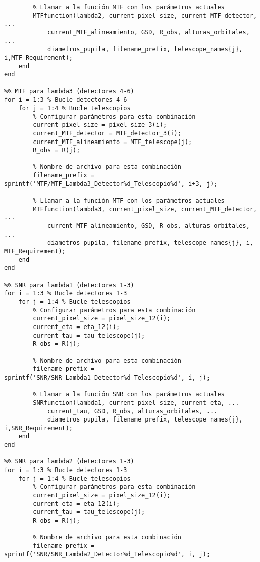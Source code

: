 \begin{verbatim}
        % Llamar a la función MTF con los parámetros actuales
        MTFfunction(lambda2, current_pixel_size, current_MTF_detector, ...
            current_MTF_alineamiento, GSD, R_obs, alturas_orbitales, ...
            diametros_pupila, filename_prefix, telescope_names{j}, i,MTF_Requirement);
    end
end

%% MTF para lambda3 (detectores 4-6)
for i = 1:3 % Bucle detectores 4-6
    for j = 1:4 % Bucle telescopios
        % Configurar parámetros para esta combinación
        current_pixel_size = pixel_size_3(i);
        current_MTF_detector = MTF_detector_3(i);
        current_MTF_alineamiento = MTF_telescope(j);
        R_obs = R(j);
        
        % Nombre de archivo para esta combinación
        filename_prefix = sprintf('MTF/MTF_Lambda3_Detector%d_Telescopio%d', i+3, j);
        
        % Llamar a la función MTF con los parámetros actuales
        MTFfunction(lambda3, current_pixel_size, current_MTF_detector, ...
            current_MTF_alineamiento, GSD, R_obs, alturas_orbitales, ...
            diametros_pupila, filename_prefix, telescope_names{j}, i, MTF_Requirement);
    end
end

%% SNR para lambda1 (detectores 1-3)
for i = 1:3 % Bucle detectores 1-3
    for j = 1:4 % Bucle telescopios
        % Configurar parámetros para esta combinación
        current_pixel_size = pixel_size_12(i);
        current_eta = eta_12(i);
        current_tau = tau_telescope(j);
        R_obs = R(j);
        
        % Nombre de archivo para esta combinación
        filename_prefix = sprintf('SNR/SNR_Lambda1_Detector%d_Telescopio%d', i, j);
        
        % Llamar a la función SNR con los parámetros actuales
        SNRfunction(lambda1, current_pixel_size, current_eta, ...
            current_tau, GSD, R_obs, alturas_orbitales, ...
            diametros_pupila, filename_prefix, telescope_names{j}, i,SNR_Requirement);
    end
end

%% SNR para lambda2 (detectores 1-3)
for i = 1:3 % Bucle detectores 1-3
    for j = 1:4 % Bucle telescopios
        % Configurar parámetros para esta combinación
        current_pixel_size = pixel_size_12(i);
        current_eta = eta_12(i);
        current_tau = tau_telescope(j);
        R_obs = R(j);
        
        % Nombre de archivo para esta combinación
        filename_prefix = sprintf('SNR/SNR_Lambda2_Detector%d_Telescopio%d', i, j);
        

\end{verbatim}
